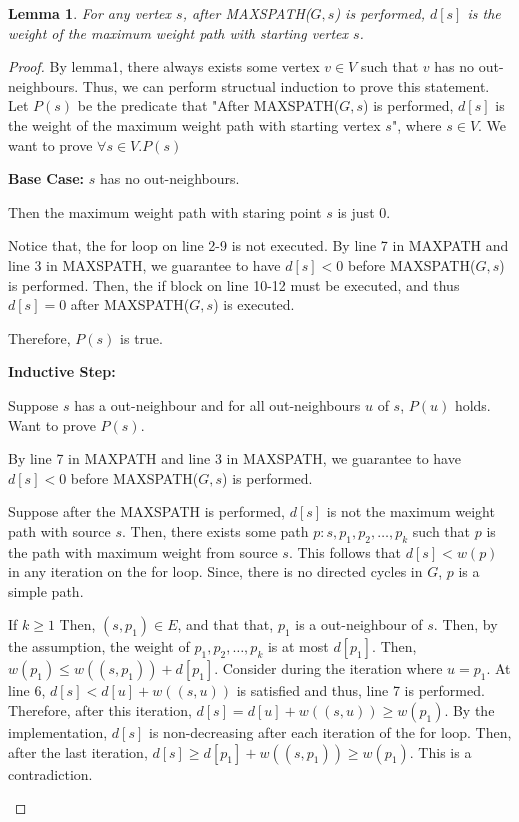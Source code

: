 \documentclass[10pt]{article}
\newtheorem{lemma}[theorem]{Lemma}
\begin{document}
\begin{lemma}
	For any vertex $s$, after MAXSPATH($G, s$) is performed, $d[s]$ is the
	weight of the maximum weight path with starting vertex $s$.
\end{lemma}
\begin{proof}
	By lemma1, there always exists some vertex $v \in V$ such that $v$ has no
	out-neighbours. 
	Thus, we can perform structual induction to prove this statement. 
	Let $P(s)$ be the predicate that "After MAXSPATH($G, s$) is performed,
	$d[s]$ is the weight of the maximum weight path with starting vertex $s$",
	where $s \in V$. 
	We want to prove $\forall s \in V. P(s)$

	\textbf{Base Case:} $s$ has no out-neighbours.
	\begin{addmargin}[1em]{0em}
		Then the maximum weight path with staring point $s$ is just 0. 
		
		Notice that, the for loop on line 2-9 is not executed.
		By line 7 in MAXPATH and line 3 in MAXSPATH, we guarantee to have
		$d[s] < 0$ before MAXSPATH($G, s$) is performed. 
		Then, the if block on line 10-12 must be executed, and thus $d[s] = 0$
		after MAXSPATH($G, s$) is executed. 

		Therefore, $P(s)$ is true.
	\end{addmargin}

	\textbf{Inductive Step:}
	\begin{addmargin}[1em]{0em}
		Suppose $s$ has a out-neighbour and for all out-neighbours $u$ of $s$,
		$P(u)$ holds. 
		Want to prove $P(s)$.

		By line 7 in MAXPATH and line 3 in MAXSPATH, we guarantee to have $d[s]
		< 0$ before MAXSPATH($G, s$) is performed.

		Suppose after the MAXSPATH is performed, $d[s]$ is not the maximum
		weight path with source $s$.
		Then, there exists some path $p: s, p_1, p_2, \ldots, p_k$ such that
		$p$ is the path with maximum weight from source $s$. 
		This follows that $d[s] < w(p)$ in any iteration on the for loop.
		Since, there is no directed cycles in $G$, $p$ is a simple path. 
		
		If $k \geq 1$
		Then, $(s, p_1) \in E$, and that that, $p_1$ is a out-neighbour of
		$s$. 
		Then, by the assumption, the weight of $p_1, p_2, \ldots, p_k$ is at
		most $d[p_1]$.
		Then, $w(p_1) \leq w((s, p_1)) + d[p_1]$.
		Consider during the iteration where $u = p_1$.
		At line 6, $d[s] < d[u] + w((s, u))$ is  satisfied and thus, line
		7 is performed.
		Therefore, after this iteration, $d[s] = d[u] + w((s, u)) \geq w(p_1)$.
		By the implementation, $d[s]$ is non-decreasing after each iteration of
		the for loop.
		Then, after the last iteration, $d[s] \geq d[p_1] + w((s, p_1)) \geq
		w(p_1)$.
		This is a contradiction. 


\end{addmargin}
\end{proof}
\end{document}
